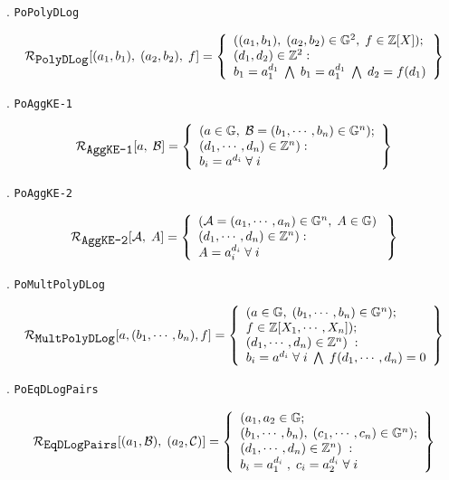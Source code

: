 \documentclass[11pt, lettersize, notitlepage, leqno, footskip=0.6cm]{article}
\newcommand{\bz}{\mathbb Z}
\newcommand{\mc}{\mathcal}
\newcommand{\mb}{\mathbb}
\newcommand{\noin}{\noindent}
\numberwithin{equation}{section}
\begin{document}
{\noin 3. \verb|PoPolyDLog| \vspace{-0.3cm}

\[
  \mc{R}_{{\protect\verb|PolyDLog|}}[(a_1, b_1),\;(a_2,b_2),\;f] = \left\{\begin{array}{l}
    ((a_1, b_1), \; (a_2,b_2)\in\mb{G}^2,\;f\in\bz[X]);\\
    (d_1, d_2)\in\mb{Z}^2: \\
    b_1 = a_1^{d_1}\; \bigwedge\; b_1 = a_1^{d_1}\; \bigwedge \;d_2 = f(d_1)
  \end{array}\right\}
\]

\noin 4. \verb|PoAggKE-1| \vspace{-0.3cm}

\[
  \mc{R}_{{\protect\verb|AggKE-1|}}[a,\; \mc{B}] = \left\{\begin{array}{l}
    (a\in\mb{G},\; \mc{B} = (b_1,\cdots, b_n)\in\mb{G}^n);\\ 
    (d_1,\cdots,d_n)\in\bz^n):  \\
    b_i = a^{d_i}\;\forall\; i
  \end{array}\right\}
\]

\noin 5. \verb|PoAggKE-2| \vspace{-0.3cm}

\[
  \mc{R}_{{\protect\verb|AggKE-2|}}[\mc{A},\;A] = \left\{\begin{array}{l}
    (\mc{A} = (a_1,\cdots, a_n)\in \mb{G}^n,\; A\in\mb{G})\;\\ 
    (d_1,\cdots,d_n)\in\bz^n) :  \\
     A = a_i^{d_i}\;\forall\; i
  \end{array}\right\}
\]

\noin 6. \verb|PoMultPolyDLog| \vspace{-0.3cm}

\[
  \mc{R}_{{\protect\verb|MultPolyDLog|}}[a, (b_1,\cdots, b_n), f] = \left\{\begin{array}{l}
    (a\in\mb{G},\; (b_1,\cdots, b_n)\in\mb{G}^n);\\
    f\in\bz[X_1,\cdots,X_n]);\\ 
    (d_1,\cdots,d_n)\in \bz^n)\;: \\
    b_i = a^{d_i}\;\forall\; i\;\bigwedge \;   f(d_1,\cdots,d_n) = 0 
  \end{array}\right\}
\]

\noin 7. \verb|PoEqDLogPairs| \vspace{-0.3cm}

\[
  \mc{R}_{{\protect\verb|EqDLogPairs|}}[(a_1, \mc{B}),\; (a_2, \mc{C})] = \left\{\begin{array}{l}
  	(a_1,a_2\in\mb{G};\\
    (b_1,\cdots, b_n),\;(c_1,\cdots, c_n)\in\mb{G}^n);\\
    (d_1,\cdots,d_n)\in \bz^n)\;: \\
    b_i = a_1^{d_i}\;,\;c_i= a_2^{d_i} \;\forall\; i
  \end{array}\right\}
\]

}
\end{document}
